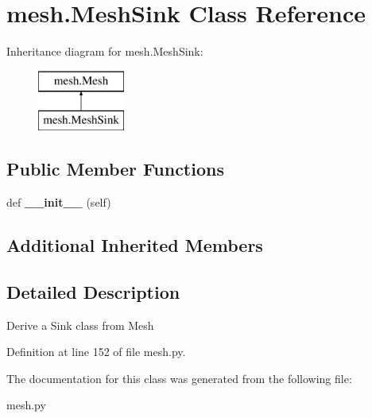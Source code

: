 \hypertarget{classmesh_1_1MeshSink}{}\section{mesh.\+Mesh\+Sink Class Reference}
\label{classmesh_1_1MeshSink}
Inheritance diagram for mesh.\+Mesh\+Sink\+:\begin{figure}[H]
\begin{center}
\leavevmode
\includegraphics[height=2.000000cm]{classmesh_1_1MeshSink}
\end{center}
\end{figure}
\subsection*{Public Member Functions}
\begin{DoxyCompactItemize}
\item 
def {\bfseries \+\_\+\+\_\+init\+\_\+\+\_\+} (self)\hypertarget{classmesh_1_1MeshSink_ac5f16f1f0460e35ac224125975761f18}{}\label{classmesh_1_1MeshSink_ac5f16f1f0460e35ac224125975761f18}

\end{DoxyCompactItemize}
\subsection*{Additional Inherited Members}


\subsection{Detailed Description}
\begin{DoxyVerb}Derive a Sink class from Mesh
\end{DoxyVerb}
 

Definition at line 152 of file mesh.\+py.



The documentation for this class was generated from the following file\+:\begin{DoxyCompactItemize}
\item 
mesh.\+py\end{DoxyCompactItemize}
